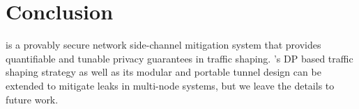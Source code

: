 \section{Conclusion}
\label{sec:conclusion}

{\sys} is a provably secure network side-channel mitigation system that provides
quantifiable and tunable privacy guarantees in traffic shaping.
{\sys}'s DP based traffic shaping strategy as well as its
modular and portable tunnel design can be extended to mitigate leaks
in multi-node systems, but we leave the details to future work.